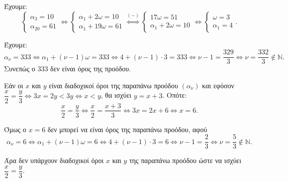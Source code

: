 
\begin{alist}
\item Έχουμε:
\[\begin{cases} \alpha_3 = 10 \\ \alpha_{20} = 61 \end{cases} \Leftrightarrow \begin{cases} \alpha_1 + 2\omega = 10 \\ \alpha_1 + 19\omega = 61 \end{cases} \stackrel{(-)}{\Leftrightarrow} \begin{cases} 17\omega = 51 \\ \alpha_1 + 2\omega = 10 \end{cases} \Leftrightarrow \begin{cases} \omega = 3 \\ \alpha_1 = 4 \end{cases}.\]

\item Έχουμε:
\[\alpha_\nu = 333 \Leftrightarrow \alpha_1 + (\nu - 1)\omega = 333 \Leftrightarrow 4 + (\nu - 1) \cdot 3 = 333 \Leftrightarrow \nu - 1 = \dfrac{329}{3} \Leftrightarrow \nu = \dfrac{332}{3} \notin \mathbb{N}.\]
Συνεπώς ο $333$ δεν είναι όρος της προόδου.

\item Εάν οι $x$ και $y$ είναι διαδοχικοί όροι της παραπάνω προόδου $(\alpha_\nu)$ και εφόσον
$\dfrac{x}{2} = \dfrac{y}{3} \Leftrightarrow 3x = 2y < 3y \Leftrightarrow x < y$, θα ισχύει $y = x + 3$. Οπότε:
\[\dfrac{x}{2} = \dfrac{y}{3} \Leftrightarrow \dfrac{x}{2} = \dfrac{x + 3}{3} \Leftrightarrow 3x = 2x + 6 \Leftrightarrow x = 6.\]

Όμως ο $x = 6$ δεν μπορεί να είναι όρος της παραπάνω προόδου, αφού
\[\alpha_\nu = 6 \Leftrightarrow \alpha_1 + (\nu - 1)\omega = 6 \Leftrightarrow 4 + (\nu - 1) \cdot 3 = 6 \Leftrightarrow \nu - 1 = \dfrac{2}{3} \Leftrightarrow \nu = \dfrac{5}{3} \notin \mathbb{N}.\]

Άρα δεν υπάρχουν διαδοχικοί όροι $x$ και $y$ της παραπάνω προόδου ώστε να ισχύει $\dfrac{x}{2} = \dfrac{y}{3}$.
\end{alist}

